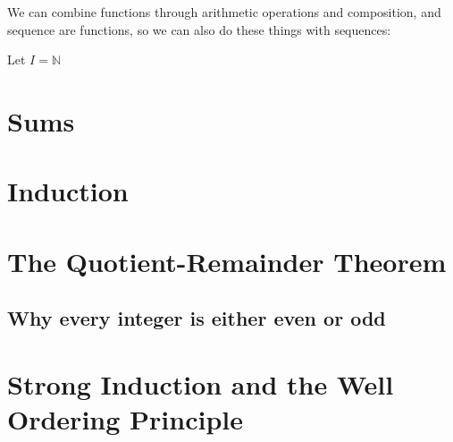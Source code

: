 We can combine functions through arithmetic operations and composition, and sequence are functions, so we can also do these things with sequences:

\begin{xca}
		Let $I = \mathbb{N}$
		\begin{enumerate}
			\end{enumerate}
	\end{xca}

\section{Sums}

\section{Induction}

\section{The Quotient-Remainder Theorem}

\subsection{Why every integer is either even or odd}

\section{Strong Induction and the Well Ordering Principle}
